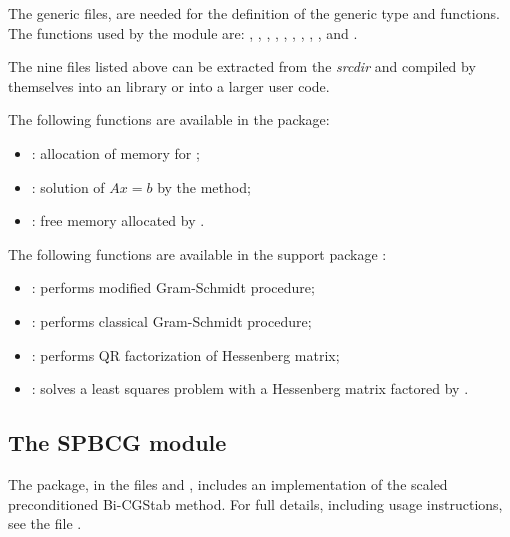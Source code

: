 The generic {\nvector} files,  are needed for the
definition of the generic  type and functions. 
The {\nvector} functions used by the {\spgmr} module are: 
, , , , , 
, , , , and
.

The nine files listed above can be extracted from the {\sundials} {\em srcdir} and
compiled by themselves into an {\spgmr} library or into a larger user code.
 
The following functions are available in the {\spgmr} package:  
\begin{itemize}
\item {}: allocation of memory for ;
\item {}: solution of $Ax = b$ by the {\spgmr} method;
\item {}: free memory allocated by .
\end{itemize}
%
The following functions are available in the support package 
:
\begin{itemize}
\item {}: performs modified Gram-Schmidt procedure;
\item {}: performs classical Gram-Schmidt procedure; 
\item {}: performs QR factorization of Hessenberg matrix;
\item {}: solves a least squares problem with a Hessenberg
       matrix factored by .
\end{itemize}


\subsection{The SPBCG module}\label{ss:spbcg}

The {\spbcg} package, in the files  and
, includes an implementation of the scaled
preconditioned Bi-CGStab method.
For full details, including usage instructions, see the file .

